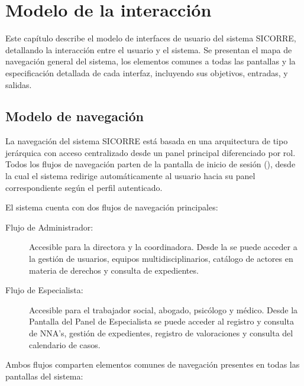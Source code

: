 \chapter{Modelo de la interacción}	
\label{cap:modInteraccion}

Este capítulo describe el modelo de interfaces de usuario del sistema SICORRE, 
detallando la interacción entre el usuario y el sistema. Se presentan el mapa 
de navegación general del sistema, los elementos comunes a todas las pantallas 
y la especificación detallada de cada interfaz, incluyendo sus objetivos, 
entradas, y salidas.


\section{Modelo de navegación}

La navegación del sistema SICORRE está basada en una arquitectura de tipo 
jerárquica con acceso centralizado desde un panel principal diferenciado por 
rol. Todos los flujos de navegación parten de la pantalla de inicio de sesión 
(), desde la cual el sistema 
redirige automáticamente al usuario hacia su panel correspondiente según 
el perfil autenticado.

El sistema cuenta con dos flujos de navegación principales:

\begin{description}
	\item[Flujo de Administrador:] Accesible para la directora y la 
	coordinadora. Desde la  
	se puede acceder a la gestión de usuarios, equipos multidisciplinarios, 
	catálogo de actores en materia de derechos y consulta de expedientes.
	
	\item[Flujo de Especialista:] Accesible para el trabajador social, 
	abogado, psicólogo y médico. Desde la 
	Pantalla del Panel de Especialista se puede acceder al 
	registro y consulta de NNA's, gestión de expedientes, registro de 
	valoraciones y consulta del calendario de casos.
\end{description}

Ambos flujos comparten elementos comunes de navegación presentes en todas 
las pantallas del sistema:

